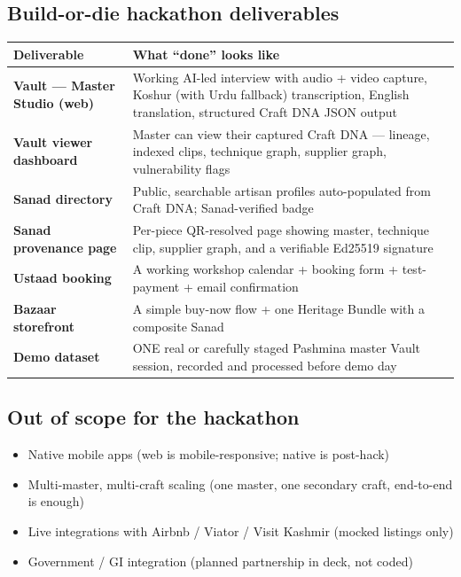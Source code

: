 \documentclass[11pt, a4paper]{article}
\begin{document}
\subsection{Build-or-die hackathon deliverables}

\begin{center}
\small
\begin{tabularx}{\linewidth}{>{\bfseries}lX}
\toprule
Deliverable & What ``done'' looks like \\
\midrule
Vault — Master Studio (web) & Working AI-led interview with audio + video capture, Koshur (with Urdu fallback) transcription, English translation, structured Craft DNA JSON output \\
Vault viewer dashboard & Master can view their captured Craft DNA --- lineage, indexed clips, technique graph, supplier graph, vulnerability flags \\
Sanad directory & Public, searchable artisan profiles auto-populated from Craft DNA; Sanad-verified badge \\
Sanad provenance page & Per-piece QR-resolved page showing master, technique clip, supplier graph, and a verifiable Ed25519 signature \\
Ustaad booking & A working workshop calendar + booking form + test-payment + email confirmation \\
Bazaar storefront & A simple buy-now flow + one Heritage Bundle with a composite Sanad \\
Demo dataset & ONE real or carefully staged Pashmina master Vault session, recorded and processed before demo day \\
\bottomrule
\end{tabularx}
\end{center}

\subsection{Out of scope for the hackathon}

\begin{itemize}
  \item Native mobile apps (web is mobile-responsive; native is post-hack)
  \item Multi-master, multi-craft scaling (one master, one secondary craft, end-to-end is enough)
  \item Live integrations with Airbnb / Viator / Visit Kashmir (mocked listings only)
  \item Government / GI integration (planned partnership in deck, not coded)
\end{itemize}
\end{document}
